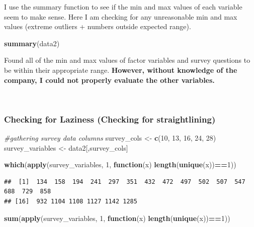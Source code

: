 \documentclass[
]{article}
\newenvironment{Shaded}{\begin{snugshade}}{\end{snugshade}}
\newcommand{\CommentTok}[1]{\textcolor[rgb]{0.56,0.35,0.01}{\textit{#1}}}
\newcommand{\ControlFlowTok}[1]{\textcolor[rgb]{0.13,0.29,0.53}{\textbf{#1}}}
\newcommand{\DecValTok}[1]{\textcolor[rgb]{0.00,0.00,0.81}{#1}}
\newcommand{\KeywordTok}[1]{\textcolor[rgb]{0.13,0.29,0.53}{\textbf{#1}}}
\newcommand{\NormalTok}[1]{#1}
\newcommand{\OperatorTok}[1]{\textcolor[rgb]{0.81,0.36,0.00}{\textbf{#1}}}
\newcommand{\StringTok}[1]{\textcolor[rgb]{0.31,0.60,0.02}{#1}}
\begin{document}
I use the summary function to see if the min and max values of each
variable seem to make sense. Here I am checking for any unreasonable min
and max values (extreme outliers + numbers outside expected range).

\begin{Shaded}
\begin{Highlighting}[]
\KeywordTok{summary}\NormalTok{(data2)}
\end{Highlighting}
\end{Shaded}

Found all of the min and max values of factor variables and survey
questions to be within their appropriate range. \textbf{However, without
knowledge of the company, I could not properly evaluate the other
variables.}

~ ~

\hypertarget{checking-for-laziness-checking-for-straightlining}{%
\subsubsection{Checking for Laziness (Checking for
straightlining)}\label{checking-for-laziness-checking-for-straightlining}}

\begin{Shaded}
\begin{Highlighting}[]
\CommentTok{#gathering survey data columns }
\NormalTok{survey_cols <-}\StringTok{ }\KeywordTok{c}\NormalTok{(}\DecValTok{10}\NormalTok{, }\DecValTok{13}\NormalTok{, }\DecValTok{16}\NormalTok{, }\DecValTok{24}\NormalTok{, }\DecValTok{28}\NormalTok{)}
\NormalTok{survey_variables <-}\StringTok{ }\NormalTok{data2[,survey_cols]}

\KeywordTok{which}\NormalTok{(}\KeywordTok{apply}\NormalTok{(survey_variables, }\DecValTok{1}\NormalTok{, }\ControlFlowTok{function}\NormalTok{(x) }\KeywordTok{length}\NormalTok{(}\KeywordTok{unique}\NormalTok{(x))}\OperatorTok{==}\DecValTok{1}\NormalTok{))}
\end{Highlighting}
\end{Shaded}

\begin{verbatim}
##  [1]  134  158  194  241  297  351  432  472  497  502  507  547  688  729  858
## [16]  932 1104 1108 1127 1142 1285
\end{verbatim}

\begin{Shaded}
\begin{Highlighting}[]
\KeywordTok{sum}\NormalTok{(}\KeywordTok{apply}\NormalTok{(survey_variables, }\DecValTok{1}\NormalTok{, }\ControlFlowTok{function}\NormalTok{(x) }\KeywordTok{length}\NormalTok{(}\KeywordTok{unique}\NormalTok{(x))}\OperatorTok{==}\DecValTok{1}\NormalTok{))}
\end{Highlighting}
\end{Shaded}
\end{document}

